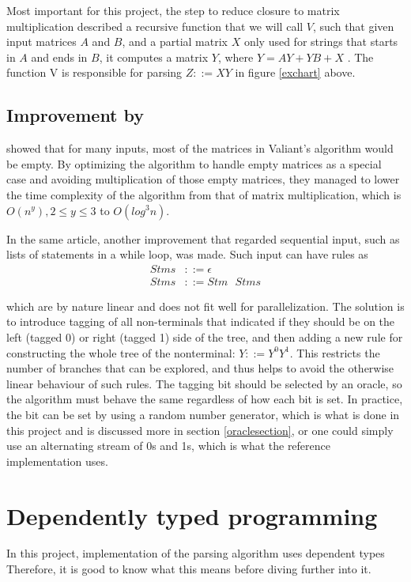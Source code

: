 \documentclass[a4paper,12pt,twosided]{report}
\renewcommand\cite{\citep}
\begin{document}
Most important for this project, the step to reduce closure to matrix
multiplication described a recursive function that we will call $V$, such that
given input matrices $A$ and $B$, and a partial matrix $X$ only used for strings
that starts in $A$ and ends in $B$, it computes a matrix $Y$, where $Y = AY + YB
+ X$ \cite{parparsepaper}. The function V is responsible for parsing $Z ::= XY$
in figure \ref{exchart} above.

\subsection{Improvement by \citeauthor{parparsepaper}}
\citet{parparsepaper} showed that for many inputs, most of the matrices
in Valiant's algorithm would be empty. By optimizing the algorithm to handle
empty matrices as a special case and avoiding multiplication of those empty
matrices, they managed to lower the time complexity of the algorithm from that
of matrix multiplication, which is $O(n^y), 2 \leq y \leq 3$ to $O(log^3 n)$. 

In the same article, another improvement that regarded sequential input, such as
lists of statements in a while loop, was made. Such input can have rules as
\begin{align*}
Stms &::= \epsilon \\
Stms &::= Stm\text{ }Stms
\end{align*}

which are by nature linear and does not fit well for parallelization. The
solution is to introduce tagging of all non-terminals that indicated if they
should be on the left (tagged 0) or right (tagged 1) side of the tree, and then
adding a new rule for constructing the whole tree of the nonterminal: $Y ::=
Y^0Y^1$. This restricts the number of branches that can be explored, and thus
helps to avoid the otherwise linear behaviour of such rules. The tagging bit
should be selected by an oracle, so the algorithm must behave the same
regardless of how each bit is set. In practice, the bit can be set by using a
random number generator, which is what is done in this project and is discussed
more in section \ref{oraclesection}, or one could simply use an alternating
stream of 0s and 1s, which is what the reference implementation uses. 

\section{Dependently typed programming}
In this project, implementation of the parsing algorithm uses dependent types
Therefore, it is good to know what this means before diving further into it.
\end{document}
